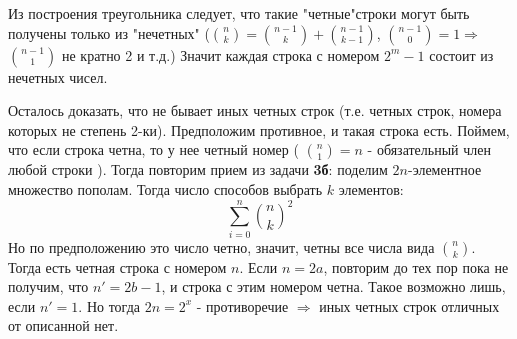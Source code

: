 \documentclass{article}
\begin{document}
 Из построения треугольника следует, что такие "четные"\space строки могут быть получены только из "нечетных" (${n \choose k} = {n - 1 \choose k} + {n - 1 \choose k - 1}$, ${n - 1 \choose 0} = 1 \Rightarrow $ ${n - 1 \choose 1}$ не кратно 2 и т.д.) Значит каждая строка с номером $2^m - 1$ состоит из нечетных чисел.
 
 Осталось доказать, что не бывает иных четных строк (т.е. четных строк, номера которых не степень 2-ки). Предположим противное, и такая строка есть. Поймем, что если строка четна, то у нее четный номер ( ${n \choose 1} = n $ - обязательный член любой строки ). Тогда повторим прием из задачи \textbf{3б}: поделим $2n$-элементное множество пополам. Тогда число способов выбрать $k$ элементов:
			 $$\sum_{i=0}^{n} {n \choose k}^2$$
 Но по предположению это число четно, значит, четны все числа вида  $ {n \choose k} $. Тогда есть четная строка с номером $n$. Если $n=2a$, повторим до тех пор пока не получим, что $n' = 2b - 1$, и строка с этим номером четна. Такое возможно лишь, если $n' = 1$. Но тогда $2n = 2^x$ - противоречие $\Rightarrow$ иных четных строк отличных от описанной нет.
 
\end{document}
